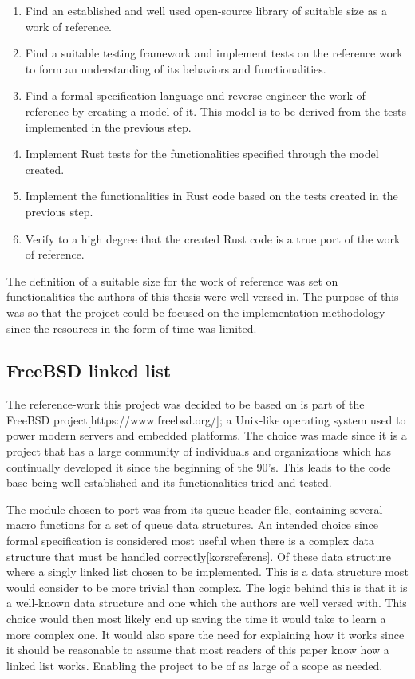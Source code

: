 \documentclass{article}
\begin{document}
\begin{enumerate}
  \item Find an established and well used open-source library of suitable size as a work of reference.
  \item Find a suitable testing framework and implement tests on the reference work to form an understanding of its behaviors and functionalities.
  \item Find a formal specification language and reverse engineer the work of reference by creating a model of it. This model is to be derived from the tests implemented in the previous step.
  \item Implement Rust tests for the functionalities specified through the model created.
  \item Implement the functionalities in Rust code based on the tests created in the previous step.
  \item Verify to a high degree that the created Rust code is a true port of the work of reference.
\end{enumerate}

The definition of a suitable size for the work of reference was set on functionalities the authors of this thesis were well versed in. The purpose of this was so that the project could be focused on the implementation methodology since the resources in the form of time was limited. 

\subsection{FreeBSD linked list}\label{frebsd}

The reference-work this project was decided to be based on is part of the FreeBSD project[https://www.freebsd.org/]; a Unix-like operating system used to power modern servers and embedded platforms. The choice was made since it is a project that has a large community of individuals and organizations which has continually developed it since the beginning of the 90's. This leads to the code base being well established and its functionalities tried and tested. 

The module chosen to port was from its queue header file, containing several macro functions for a set of queue data structures. An intended choice since   formal specification is considered most useful when there is a complex data structure that must be handled correctly[korsreferens]. Of these data structure where a singly linked list chosen to be implemented. This is a data structure most would consider to be more trivial than complex. The logic behind this is that it is a well-known data structure and one which the authors are well versed with. This choice would then most likely end up saving the time it would take to learn a more complex one. It would also spare the need for explaining how it works since it should be reasonable to assume that most readers of this paper know how a linked list works. Enabling the project to be of as large of a scope as needed.
\end{document}
